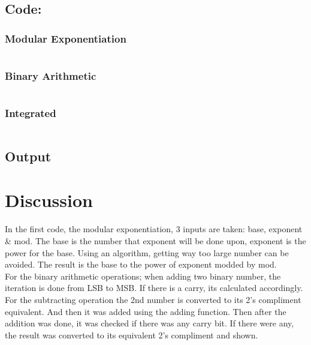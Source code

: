 \documentclass[12pt]{article}
\begin{document}
\subsection{Code:}
\subsubsection{Modular Exponentiation}
\inputminted[breaklines,linenos]{python3}{codes/amodularExpo.py}

\vspace{13mm}

\subsubsection{Binary Arithmetic}
\inputminted[breaklines,linenos]{python3}{codes/bbinaryAddSub.py}

\vspace{13mm}

\subsubsection{Integrated}
\inputminted[breaklines,linenos]{python3}{codes/cintegrated.py}

\vspace{20mm}
\subsection{Output}


\section{Discussion}
In the first code, the modular exponentiation, 3 inputs are taken: base, exponent \& mod. The base is the number that exponent will be done upon, exponent is the power for the base. Using an algorithm, getting way too large number can be avoided. The result is the base to the power of exponent modded by mod.\\
For the binary arithmetic operations; when adding two binary number, the iteration is done from LSB to MSB. If there is a carry, its calculated accordingly.\\
For the subtracting operation the 2nd number is converted to its 2's compliment equivalent. And then it was added using the adding function. Then after the addition was done, it was checked if there was any carry bit. If there were any, the result was converted to its equivalent 2's compliment and shown.



\end{document}
